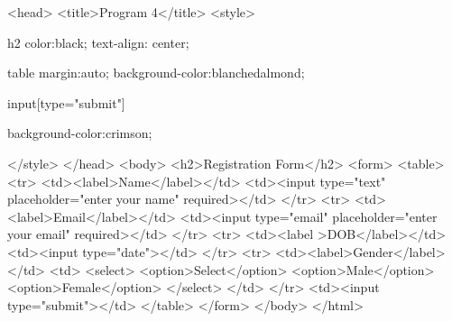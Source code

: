 
<head> 
    <title>Program 4</title> 
    <style>
    
    h2{ 
        color:black; 
        text-align: center; 
        } 
        
       

        table{ 
        margin:auto; 
        background-color:blanchedalmond;  
        }
         
        input[type="submit"]{ 
        background-color:crimson; 
        
        }
        </style> 
</head> 
<body> 
    <h2>Registration Form</h2> 
    <form> 
        <table> 
            <tr> 
                <td><label>Name</label></td> 
                <td><input type="text" placeholder="enter your name" required></td> 
            </tr> 
            <tr> 
                <td><label>Email</label></td> 
                <td><input type="email" placeholder="enter your email" required></td> 
            </tr> 
            <tr> 
                <td><label >DOB</label></td> 
                <td><input type="date"></td> 
            </tr> 
            <tr> 
                <td><label>Gender</label></td> 
                <td> 
                    <select> 
                        <option>Select</option> 
                        <option>Male</option> 
                        <option>Female</option> 
                    </select> 
                </td> 
</tr> 
<td><input type="submit"></td> 
</table> 
</form> 
</body> 
</html>
